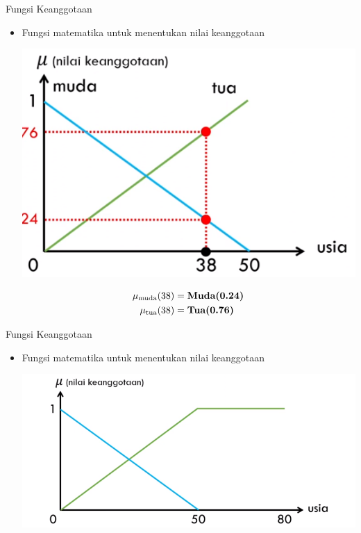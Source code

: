 \documentclass[pdflatex,compress,mathserif]{beamer}
\begin{document}
\begin{frame}{Fungsi Keanggotaan}
	\begin{itemize}
		\item Fungsi matematika untuk menentukan nilai keanggotaan
		\begin{multicols}{2}
			\begin{center}
				\includegraphics[width=\linewidth]{img/10}
			\end{center}
			\columnbreak
			\begin{align*}
				\mu_{\text{muda}}(38) &= \text{\textbf{Muda(0.24)}} \\
				\mu_{\text{tua}}(38) &= \text{\textbf{Tua(0.76)}} 
			\end{align*}
		\end{multicols}
	\end{itemize}
\end{frame}

\begin{frame}{Fungsi Keanggotaan}
	\begin{itemize}
		\item Fungsi matematika untuk menentukan nilai keanggotaan
		\begin{center}
			\includegraphics[width=0.7\linewidth]{img/12}
		\end{center}
	\end{itemize}
\end{frame}
\end{document}
